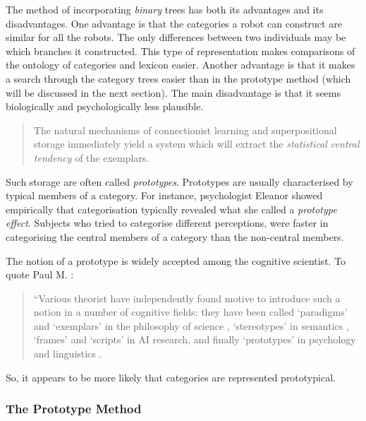 The method of incorporating {\em binary} trees has both its advantages and its disadvantages. One advantage is that the categories a robot can construct are similar for all the robots. The only differences between two individuals may be which branches it constructed. This type of representation makes comparisons of the ontology of categories and lexicon easier. Another advantage is that it makes a search through the category trees easier than in the prototype method (which will be discussed in the next section). The main disadvantage is that it seems biologically and psychologically less plausible.

\begin{quote}
The natural mechanisms of connectionist learning and superpositional storage immediately yield a system which will extract the {\em statistical central tendency} of the exemplars. \cite[p. 16]{a.clark:1993}
\end{quote}

\n
Such storage are often called {\em prototypes}. Prototypes are usually characterised by typical members of a category. For instance,  psychologist Eleanor showed empirically that categorisation typically revealed what she called a {\em prototype effect}. Subjects who tried to categorise different perceptions, were faster in categorising the central members of a category than the non-central members. 

The notion of a prototype is widely accepted among the cognitive scientist. To quote Paul M. :

\begin{quote}
``Various theorist have independently found motive to introduce such a notion in a number of cognitive fields: they have been called `paradigms' and `exemplars' in the philosophy of science \cite{kuhn:1962}, `stereotypes' in semantics \cite{putnam:1975}, `frames' \cite{minsky:1981} and `scripts' \cite{schank:1977} in AI research, and finally `prototypes' in psychology \cite{rosch:1976} and linguistics \cite{lakoff:1987}.
\end{quote}

So, it appears to be more likely that categories are represented prototypical. 
\subsubsection{The Prototype Method}\label{s:cm:proto}\label{s:cm:prototype}

